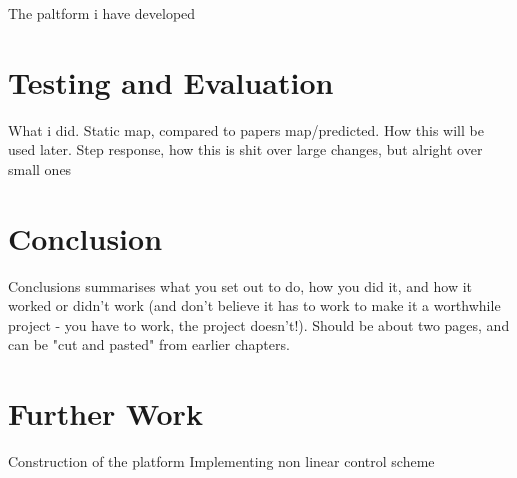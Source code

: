 \documentclass[11pt,a4paper]{article}
\begin{document}

The paltform i have developed

\newpage
\section{Testing and Evaluation}
\label{sec:results}

What i did. Static map, compared to papers map/predicted. How this will be used later.
\newline
Step response, how this is shit over large changes, but alright over small ones

\newpage
\section{Conclusion}
\label{sec:conclusion}

Conclusions summarises what you set out to do, how you did it, and how it worked or
didn't work (and don't believe it has to work to make it a worthwhile project - you
have to work, the project doesn't!). Should be about two pages, and can be "cut and
pasted" from earlier chapters.

\newpage
\section{Further Work}
\label{sec:further}

Construction of the platform \newline
Implementing non linear control scheme \newline

\newpage

\printbibliography
\end{document}

